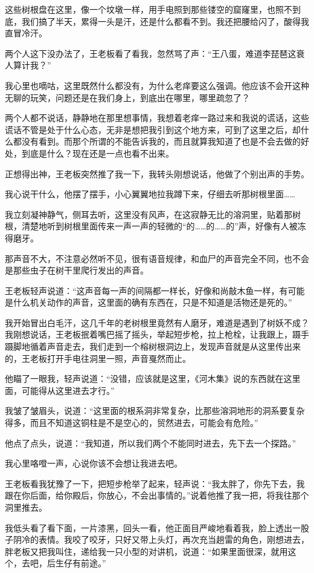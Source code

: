 这些树根盘在这里，像一个坟墩一样，用手电照到那些镂空的窟窿里，也照不到底，我们搞了半天，累得一头是汗，还是什么都看不到。我还把腰给闪了，酸得我直冒冷汗。

两个人这下没办法了，王老板看了看我，忽然骂了声：“王八蛋，难道李琵琶这衰人算计我？”

我心里也嘀咕，这里既然什么都没有，为什么老痒要这么强调。他应该不会开这种无聊的玩笑，问题还是在我们身上，到底出在哪里，哪里疏忽了？

两个人都不说话，静静地在那里想事情，我想着老痒一路过来和我说的谎话，这些谎话不管是处于什么心态，无非是想把我引到这个地方来，可到了这里之后，却什么都没有看到。而那个所谓的不能告诉我的，而且就算我知道了也是不会去做的好处，到底是什么？现在还是一点也看不出来。

正想得出神，王老板突然推了我一下，我转头刚想说话，他做了个别出声的手势。

我心说干什么，他摆了摆手，小心翼翼地拉我蹲下来，仔细去听那树根里面……

我立刻凝神静气，侧耳去听，这里没有风声，在这寂静无比的溶洞里，贴着那树根，清楚地听到树根里面传来一声一声的轻微的“的……的……的”声，好像有人被冻得磨牙。

那声音不大，不注意必然听不见，很有语音规律，和血尸的声音完全不同，也不会是那些虫子在树干里爬行发出的声音。

王老板轻声说道：“这声音每一声的间隔都一样长，好像和尚敲木鱼一样，有可能是什么机关动作的声音，这里面的确有东西在，只是不知道是活物还是死的。”

我开始冒出白毛汗，这几千年的老树根里竟然有人磨牙，难道是遇到了树妖不成？我刚想说话，王老板抿着嘴巴摇了摇头，举起短步枪，拉上枪栓，让我跟上，蹑手蹑脚地循着声音走去，我们走到一个榕树根洞边上，发现声音就是从这里传出来的，王老板打开手电往洞里一照，声音戛然而止。

他瞄了一眼我，轻声说道：“没错，应该就是这里，《河木集》说的东西就在这里面，可能得从这里进去才行。”

我皱了皱眉头，说道：“这里面的根系洞非常复杂，比那些溶洞地形的洞系要复杂得多，而且不知道这铜柱是不是空心的，贸然进去，可能会有危险。”

他点了点头，说道：“我知道，所以我们两个不能同时进去，先下去一个探路。”

我心里咯噔一声，心说你该不会想让我进去吧。

王老板看我犹豫了一下，把短步枪举了起来，轻声说：“我太胖了，你先下去，我跟在你后面，给你殿后，你放心，不会出事情的。”说着他推了我一把，将我往那个洞里推去。

我低头看了看下面，一片漆黑，回头一看，他正面目严峻地看着我，脸上透出一股子阴冷的表情。我咬了咬牙，只好又带上头灯，再次充当趟雷的角色，刚想进去，胖老板又把我叫住，递给我一只小型的对讲机，说道：“如果里面很深，就用这个，去吧，后生仔有前途。”

